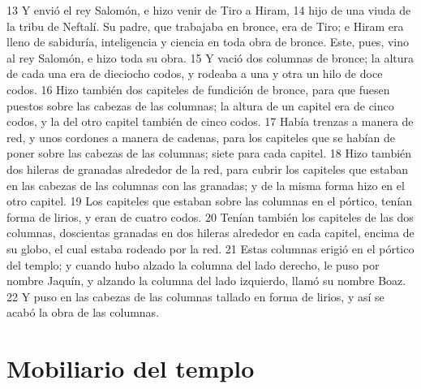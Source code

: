  
13 Y envió el rey Salomón, e hizo venir de Tiro a Hiram,
14 hijo de una viuda de la tribu de Neftalí. Su padre, que trabajaba en bronce, era de Tiro; e Hiram era lleno de sabiduría, inteligencia y ciencia en toda obra de bronce. Este, pues, vino al rey Salomón, e hizo toda su obra.
15 Y vació dos columnas de bronce; la altura de cada una era de dieciocho codos,  y rodeaba a una y otra un hilo de doce codos.
16 Hizo también dos capiteles de fundición de bronce, para que fuesen puestos sobre las cabezas de las columnas; la altura de un capitel era de cinco codos,  y la del otro capitel también de cinco codos.
17 Había trenzas a manera de red, y unos cordones a manera de cadenas, para los capiteles que se habían de poner sobre las cabezas de las columnas; siete para cada capitel.
18 Hizo también dos hileras de granadas alrededor de la red, para cubrir los capiteles que estaban en las cabezas de las columnas con las granadas; y de la misma forma hizo en el otro capitel.
19 Los capiteles que estaban sobre las columnas en el pórtico, tenían forma de lirios, y eran de cuatro codos.
20 Tenían también los capiteles de las dos columnas, doscientas granadas en dos hileras alrededor en cada capitel, encima de su globo, el cual estaba rodeado por la red.
21 Estas columnas erigió en el pórtico del templo; y cuando hubo alzado la columna del lado derecho, le puso por nombre Jaquín, y alzando la columna del lado izquierdo, llamó su nombre Boaz.
22 Y puso en las cabezas de las columnas tallado en forma de lirios, y así se acabó la obra de las columnas.
\section*{Mobiliario del templo}

